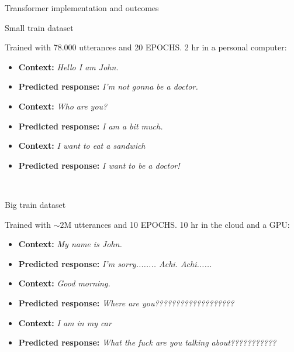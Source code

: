\documentclass[final]{beamer}
\newlength{\onecolwid}
\newlength{\twocolwid}
\begin{document}
\begin{frame}[t]
\begin{columns}[t]
\begin{column}{\twocolwid}
\begin{columns}[t,totalwidth=\twocolwid]
\begin{column}{\onecolwid}
\begin{block}{Transformer implementation and outcomes}
\begin{alertblock}{Small train dataset}

Trained with 78.000 utterances and 20 EPOCHS. 2 hr in a personal computer:

\begin{itemize} 
	\item \textbf{Context:} \textit{Hello I am John.}
	\item \textbf{Predicted response:} \textit{I'm not gonna be a doctor.}
\end{itemize}

\begin{itemize} 
	\item \textbf{Context:} \textit{Who are you?}
	\item \textbf{Predicted response:} \textit{I am a bit much.}
\end{itemize}

\begin{itemize} 
	\item \textbf{Context:} \textit{I want to eat a sandwich}
	\item \textbf{Predicted response:} \textit{I want to be a doctor!}
\end{itemize}\\
\end{alertblock}

\begin{alertblock}{Big train dataset}

Trained with $\sim2$M utterances and 10 EPOCHS. 10 hr in the cloud and a GPU:

\begin{itemize} 
	\item \textbf{Context:} \textit{My name is John.}
	\item \textbf{Predicted response:} \textit{I'm sorry........ Achi. Achi......}
\end{itemize}

\begin{itemize} 
	\item \textbf{Context:} \textit{Good morning.}
	\item \textbf{Predicted response:} \textit{Where are you???????????????????}
\end{itemize}

\begin{itemize} 
	\item \textbf{Context:} \textit{I am in my car}
	\item \textbf{Predicted response:} \textit{What the fuck are you talking about???????????}
\end{itemize}


\end{alertblock}
\end{block}
\end{column}
\end{columns}
\end{column}
\end{columns}
\end{frame}
\end{document}
